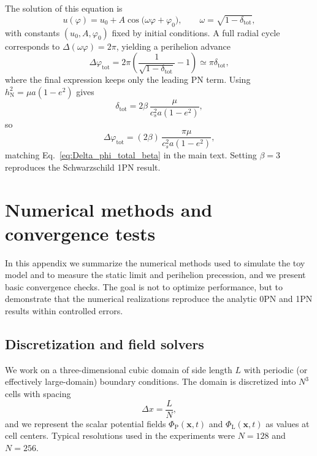 \documentclass[11pt]{article}
\newcommand{\cS}{c_s}
\newcommand{\PhiP}{\Phi_{\mathrm{P}}}
\newcommand{\PhiL}{\Phi_{\mathrm{L}}}
\begin{document}
The solution of this equation is
\begin{equation}
  u(\varphi)
  = u_0 + A \cos\bigl(\omega \varphi + \varphi_0\bigr),
  \qquad
  \omega = \sqrt{1 - \delta_{\mathrm{tot}}},
\end{equation}
with constants $(u_0,A,\varphi_0)$ fixed by initial conditions. A full radial cycle corresponds to $\Delta(\omega \varphi) = 2\pi$, yielding a perihelion advance
\begin{equation}
  \Delta \varphi_{\mathrm{tot}}
  = 2\pi\left(\frac{1}{\sqrt{1 - \delta_{\mathrm{tot}}}} - 1\right)
  \simeq \pi \delta_{\mathrm{tot}},
\end{equation}
where the final expression keeps only the leading PN term. Using $h_{\mathrm{N}}^2 = \mu a(1-e^2)$ gives
\begin{equation}
  \delta_{\mathrm{tot}}
  = 2\beta\,\frac{\mu}{\cS^2 a(1-e^2)},
\end{equation}
so
\begin{equation}
  \Delta \varphi_{\mathrm{tot}}
  = (2\beta)\,\frac{\pi \mu}{\cS^2 a (1-e^2)},
\end{equation}
matching Eq.~\eqref{eq:Delta_phi_total_beta} in the main text. Setting $\beta = 3$ reproduces the Schwarzschild 1PN result.

\section{Numerical methods and convergence tests}
\label{app:numerics}

In this appendix we summarize the numerical methods used to simulate the toy model and to measure the static limit and perihelion precession, and we present basic convergence checks. The goal is not to optimize performance, but to demonstrate that the numerical realizations reproduce the analytic 0PN and 1PN results within controlled errors.

\subsection{Discretization and field solvers}
\label{app:numerics_discretization}

We work on a three-dimensional cubic domain of side length $L$ with periodic (or effectively large-domain) boundary conditions. The domain is discretized into $N^3$ cells with spacing
\begin{equation}
  \Delta x = \frac{L}{N},
\end{equation}
and we represent the scalar potential fields $\PhiP(\mathbf{x},t)$ and $\PhiL(\mathbf{x},t)$ as values at cell centers. Typical resolutions used in the experiments were $N = 128$ and $N = 256$.
\end{document}
